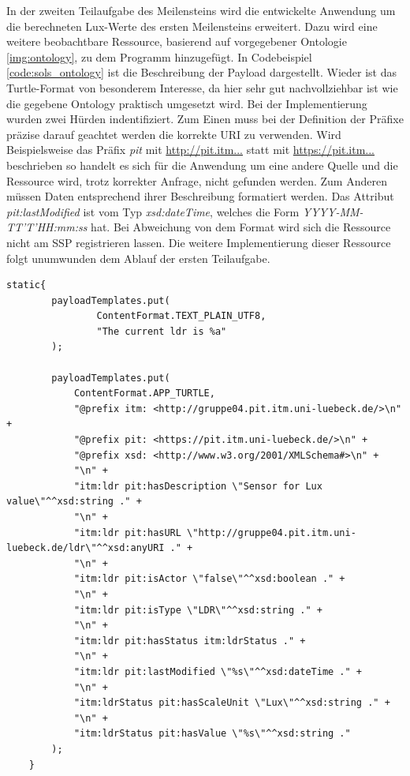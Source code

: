In der zweiten Teilaufgabe des Meilensteins wird die entwickelte Anwendung um die berechneten Lux-Werte des ersten Meilensteins erweitert. Dazu wird eine weitere beobachtbare Ressource, basierend auf vorgegebener Ontologie \ref{img:ontology}, zu dem Programm hinzugefügt. In Codebeispiel \ref{code:sols_ontology} ist die Beschreibung der Payload dargestellt. Wieder ist das Turtle-Format von besonderem Interesse, da hier sehr gut nachvollziehbar ist wie die gegebene Ontology praktisch umgesetzt wird. Bei der Implementierung wurden zwei Hürden indentifiziert. Zum Einen muss bei der Definition der Präfixe präzise darauf geachtet werden die korrekte URI zu verwenden. Wird Beispielsweise das Präfix \textit{pit} mit \url{http://pit.itm...} statt mit \url{https://pit.itm...} beschrieben so handelt es sich für die Anwendung um eine andere Quelle und die Ressource wird, trotz korrekter Anfrage, nicht gefunden werden. Zum Anderen müssen Daten entsprechend ihrer Beschreibung formatiert werden. Das Attribut \textit{pit:lastModified} ist vom Typ \textit{xsd:dateTime}, welches die Form \textit{YYYY-MM-TT'T'HH:mm:ss} hat. Bei Abweichung von dem Format wird sich die Ressource nicht am SSP registrieren lassen. Die weitere Implementierung dieser Ressource folgt unumwunden dem Ablauf der ersten Teilaufgabe.

\begin{lstlisting}[float=htb,caption={SimpleObservableLuxService Beschreibung der Payload},label=code:sols_ontology]
static{
        payloadTemplates.put(
                ContentFormat.TEXT_PLAIN_UTF8,
                "The current ldr is %a"
        );

        payloadTemplates.put(
	        ContentFormat.APP_TURTLE,
	        "@prefix itm: <http://gruppe04.pit.itm.uni-luebeck.de/>\n" +
	        "@prefix pit: <https://pit.itm.uni-luebeck.de/>\n" +
	        "@prefix xsd: <http://www.w3.org/2001/XMLSchema#>\n" +
			"\n" + 
	        "itm:ldr pit:hasDescription \"Sensor for Lux value\"^^xsd:string ." +
	        "\n" + 
			"itm:ldr pit:hasURL \"http://gruppe04.pit.itm.uni-luebeck.de/ldr\"^^xsd:anyURI ." +
			"\n" + 
			"itm:ldr pit:isActor \"false\"^^xsd:boolean ." +
			"\n" + 
			"itm:ldr pit:isType \"LDR\"^^xsd:string ." +
			"\n" + 
	        "itm:ldr pit:hasStatus itm:ldrStatus ." +
			"\n" + 
	        "itm:ldr pit:lastModified \"%s\"^^xsd:dateTime ." +			
	        "\n" + 
	        "itm:ldrStatus pit:hasScaleUnit \"Lux\"^^xsd:string ." +
	        "\n" +
	        "itm:ldrStatus pit:hasValue \"%s\"^^xsd:string ."
        );        
    }
\end{lstlisting}

